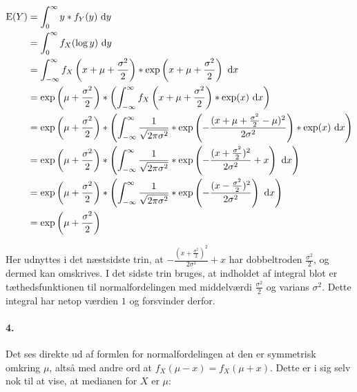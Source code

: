 \begin{align*}
\mathrm{E}(Y)
&= \int_0^\infty y*f_Y(y)\ \mathrm{d} y \\
&= \int_0^\infty f_X(\log y)\ \mathrm{d} y \\
&= \int_{-\infty}^\infty
     f_X\left(x + \mu + \frac{\sigma^2}{2}\right) *
     \mathrm{exp}\left(x + \mu + \frac{\sigma^2}{2}\right)
   \ \mathrm{d} x \\
&= \exp\left(\mu + \frac{\sigma^2}{2}\right) * \left(\int_{-\infty}^\infty
     f_X\left(x + \mu + \frac{\sigma^2}{2}\right) *
     \mathrm{exp}(x)
   \ \mathrm{d} x\right) \\
&= \exp\left(\mu + \frac{\sigma^2}{2}\right) * \left(\int_{-\infty}^\infty
     \frac{1}{\sqrt{2\pi\sigma^2}} *
     \mathrm{exp}\left(-\frac{(x + \mu + \frac{\sigma^2}{2} - \mu)^2}{2\sigma^2}\right) *
     \mathrm{exp}(x)
   \ \mathrm{d} x\right) \\
&= \exp\left(\mu + \frac{\sigma^2}{2}\right) * \left(\int_{-\infty}^\infty
     \frac{1}{\sqrt{2\pi\sigma^2}} *
     \mathrm{exp}\left(-\frac{(x + \frac{\sigma^2}{2})^2}{2\sigma^2} + x\right)
   \ \mathrm{d} x\right) \\
&= \exp\left(\mu + \frac{\sigma^2}{2}\right) * \left(\int_{-\infty}^\infty
     \frac{1}{\sqrt{2\pi\sigma^2}} *
     \mathrm{exp}\left(-\frac{(x - \frac{\sigma^2}{2})^2}{2\sigma^2}\right)
   \ \mathrm{d} x\right) \\
&= \exp\left(\mu + \frac{\sigma^2}{2}\right) \\
\end{align*}

Her udnyttes i det næstsidste trin, at $-\frac{(x + \frac{\sigma^2}{2})^2}{2\sigma^2} + x$ har
dobbeltroden $\frac{\sigma^2}{2}$, og dermed kan omskrives. I det sidste trin
bruges, at indholdet af integral blot er tæthedsfunktionen til
normalfordelingen med middelværdi $\frac{\sigma^2}{2}$ og varians $\sigma^2$.
Dette integral har netop værdien $1$ og forsvinder derfor.

\paragraph{4.} Det ses direkte ud af formlen for normalfordelingen at den er
symmetrisk omkring $\mu$, altså med andre ord at $f_X(\mu - x) = f_X(\mu +
x)$. Dette er i sig selv nok til at vise, at medianen for $X$ er $\mu$:

